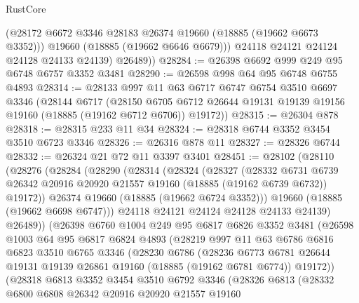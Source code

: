 \begin{lexlean}{RustCore}
\begin{coremodule}
            (@28172 @6672 @3346 @28183 @26374 @19660 (@18885 (@19662 @6673 @3352)))
            @19660
            (@18885 (@19662 @6646 @6679)))
          @24118
          @24121
          @24124
          @24128
          @24133
          @24139)
        @26489))
@28284 := @26398 @6692 @999 @249 @95 @6748 @6757 @3352 @3481
@28290 := @26598 @998 @64 @95 @6748 @6755 @4893
@28314 := @28133
    @997
    @11
    @63
    @6717
    @6747
    @6754
    @3510
    @6697
    @3346
    (@28144
      @6717
      (@28150 @6705 @6712 @26644 @19131 @19139 @19156 @19160 (@18885 (@19162 @6712 @6706)) @19172))
@28315 := @26304 @878
@28318 := @28315 @233 @11 @34
@28324 := @28318 @6744 @3352 @3454 @3510 @6723 @3346
@28326 := @26316 @878 @11
@28327 := @28326 @6744
@28332 := @26324 @21 @72 @11 @3397 @3401
@28451 := @28102
    (@28110
      (@28276
        (@28284
          (@28290
            (@28314
              (@28324
                (@28327
                  (@28332
                    @6731
                    @6739
                    @26342
                    @20916
                    @20920
                    @21557
                    @19160
                    (@18885 (@19162 @6739 @6732))
                    @19172))
                @26374
                @19660
                (@18885 (@19662 @6724 @3352)))
              @19660
              (@18885 (@19662 @6698 @6747)))
            @24118
            @24121
            @24124
            @24128
            @24133
            @24139)
          @26489))
      (@26398
        @6760
        @1004
        @249
        @95
        @6817
        @6826
        @3352
        @3481
        (@26598
          @1003
          @64
          @95
          @6817
          @6824
          @4893
          (@28219
            @997
            @11
            @63
            @6786
            @6816
            @6823
            @3510
            @6765
            @3346
            (@28230
              @6786
              (@28236
                @6773
                @6781
                @26644
                @19131
                @19139
                @26861
                @19160
                (@18885 (@19162 @6781 @6774))
                @19172))
            (@28318
              @6813
              @3352
              @3454
              @3510
              @6792
              @3346
              (@28326
                @6813
                (@28332
                  @6800
                  @6808
                  @26342
                  @20916
                  @20920
                  @21557
                  @19160

\end{coremodule}
\end{lexlean}
